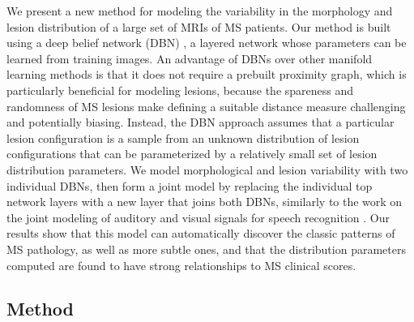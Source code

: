 We present a new method for modeling the variability in the morphology and
lesion distribution of a large set of MRIs of MS patients. Our method is built
using a deep belief network (DBN) \cite{Hinton2006b}, a layered network whose
parameters can be learned from training images. An advantage of DBNs over other
manifold learning methods is that it does not require a prebuilt proximity
graph, which is particularly beneficial for modeling lesions, because the
spareness and randomness of MS lesions make defining a suitable distance measure
challenging and potentially biasing. Instead, the DBN approach assumes that a
particular lesion configuration is a sample from an unknown distribution of
lesion configurations that can be parameterized by a relatively small set of
lesion distribution parameters. We model morphological and lesion variability
with two individual DBNs, then form a joint model by replacing the individual
top network layers with a new layer that joins both DBNs, similarly to the work
on the joint modeling of auditory and visual signals for speech recognition
\cite{Ngiam2011}. Our results show that this model can automatically discover
the classic patterns of MS pathology, as well as more subtle ones, and that the
distribution parameters computed are found to have strong relationships to MS
clinical scores.


\subsection{Method}


